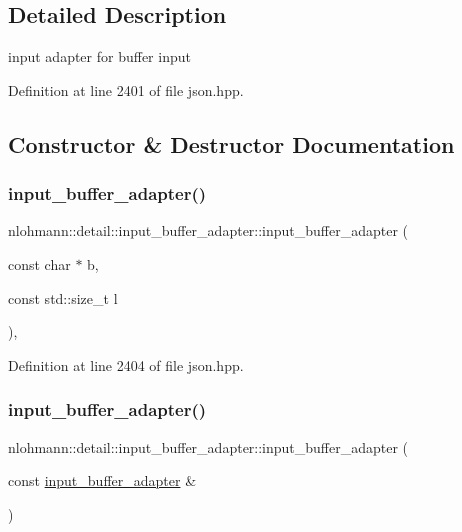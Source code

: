 \subsection{Detailed Description}
input adapter for buffer input 

Definition at line 2401 of file json.\+hpp.



\subsection{Constructor \& Destructor Documentation}
\mbox{\label{classnlohmann_1_1detail_1_1input__buffer__adapter_ad9b912fabdcb53de255e8c444d625ac3}} 
\subsubsection{\texorpdfstring{input\_buffer\_adapter()}{input\_buffer\_adapter()}\hspace{0.1cm}{\footnotesize\ttfamily [1/3]}}
{\footnotesize\ttfamily nlohmann\+::detail\+::input\+\_\+buffer\+\_\+adapter\+::input\+\_\+buffer\+\_\+adapter (\begin{DoxyParamCaption}\item[{const char $\ast$}]{b,  }\item[{const std\+::size\+\_\+t}]{l }\end{DoxyParamCaption})\hspace{0.3cm}{\ttfamily [inline]}, {\ttfamily [noexcept]}}



Definition at line 2404 of file json.\+hpp.

\mbox{\label{classnlohmann_1_1detail_1_1input__buffer__adapter_ada76d7b75c5d6b989af0e18687ef07b6}} 
\subsubsection{\texorpdfstring{input\_buffer\_adapter()}{input\_buffer\_adapter()}\hspace{0.1cm}{\footnotesize\ttfamily [2/3]}}
{\footnotesize\ttfamily nlohmann\+::detail\+::input\+\_\+buffer\+\_\+adapter\+::input\+\_\+buffer\+\_\+adapter (\begin{DoxyParamCaption}\item[{const \mbox{\hyperlink{classnlohmann_1_1detail_1_1input__buffer__adapter}{input\+\_\+buffer\+\_\+adapter}} \&}]{ }\end{DoxyParamCaption})\hspace{0.3cm}{\ttfamily [delete]}}

